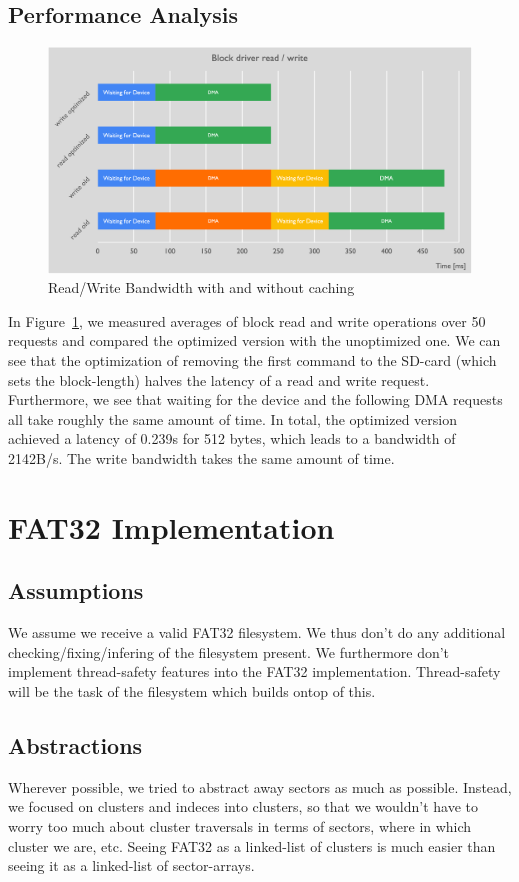 \subsection{Performance Analysis}
\begin{figure}[h]
    \centering
    \includegraphics[scale=0.5]{block_driver.png}
    \caption{Read/Write Bandwidth with and without caching}
    \label{fig:block_driver}
\end{figure}

In Figure~\ref{fig:block_driver}, we measured averages of block read and write operations over 50 requests and compared the optimized version with 
the unoptimized one. We can see that the optimization of removing the first command to the SD-card (which sets the block-length)
halves the latency of a read and write request. Furthermore, we see that waiting for the device and the following DMA requests
all take roughly the same amount of time.
In total, the optimized version achieved a latency of 0.239s for 512 bytes, which leads to a bandwidth of 2142B/s. The write bandwidth
takes the same amount of time.
\section{FAT32 Implementation}

\subsection{Assumptions}
We assume we receive a valid FAT32 filesystem. We thus don't do any additional 
checking/fixing/infering of the filesystem present.
We furthermore don't implement thread-safety features into the FAT32 implementation.
Thread-safety will be the task of the filesystem which builds ontop of this.

\subsection{Abstractions}
Wherever possible, we tried to abstract away sectors as much as possible.
Instead, we focused on clusters and indeces into clusters, so that 
we wouldn't have to worry too much about cluster traversals in terms of 
sectors, where in which cluster we are, etc. Seeing FAT32 as a linked-list 
of clusters is much easier than seeing it as a linked-list of sector-arrays.

